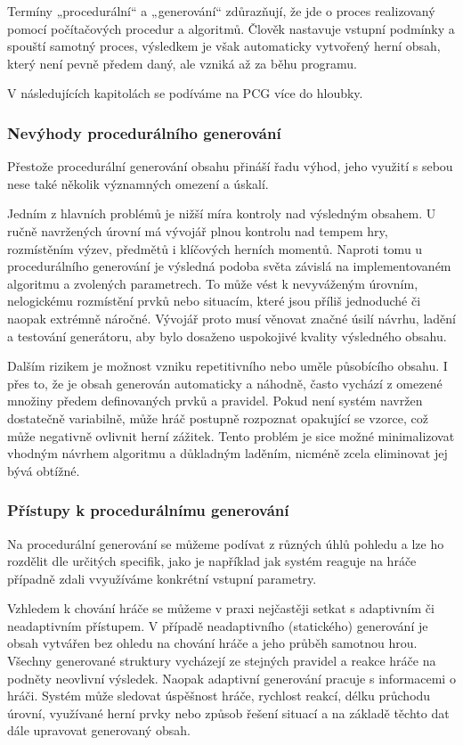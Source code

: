 \documentclass[
  program=itk,
  biblatex,
  figures=false,
  glossaries,
  index
]{kidiplom}
\begin{document}
Termíny „procedurální“ a „generování“ zdůrazňují, že jde o proces realizovaný pomocí počítačových procedur a algoritmů. Člověk nastavuje vstupní podmínky a spouští samotný proces, výsledkem je však automaticky vytvořený herní obsah, který není pevně předem daný, ale vzniká až za běhu programu.

V následujících kapitolách se podíváme na PCG více do hloubky.



\subsubsection{Nevýhody procedurálního generování}
Přestože procedurální generování obsahu přináší řadu výhod, jeho využití s sebou nese také několik významných omezení a úskalí.

Jedním z hlavních problémů je nižší míra kontroly nad výsledným obsahem. U ručně navržených úrovní má vývojář plnou kontrolu nad tempem hry, rozmístěním výzev, předmětů i klíčových herních momentů. Naproti tomu u procedurálního generování je výsledná podoba světa závislá na implementovaném algoritmu a zvolených parametrech. To může vést k nevyváženým úrovním, nelogickému rozmístění prvků nebo situacím, které jsou příliš jednoduché či naopak extrémně náročné. Vývojář proto musí věnovat značné úsilí návrhu, ladění a testování generátoru, aby bylo dosaženo uspokojivé kvality výsledného obsahu.

Dalším rizikem je možnost vzniku repetitivního nebo uměle působícího obsahu. I přes to, že je obsah generován automaticky a náhodně, často vychází z omezené množiny předem definovaných prvků a pravidel. Pokud není systém navržen dostatečně variabilně, může hráč postupně rozpoznat opakující se vzorce, což může negativně ovlivnit herní zážitek. Tento problém je sice možné minimalizovat vhodným návrhem algoritmu a důkladným laděním, nicméně zcela eliminovat jej bývá obtížné.


\subsubsection{Přístupy k procedurálnímu generování}
Na procedurální generování se můžeme podívat z různých úhlů pohledu a lze ho rozdělit dle určitých specifik, jako je například jak systém reaguje na hráče případně zdali vvyužíváme konkrétní vstupní parametry.

Vzhledem k chování hráče se můžeme v praxi nejčastěji setkat s adaptivním či neadaptivním přístupem. V případě neadaptivního (statického) generování je obsah vytvářen bez ohledu na chování hráče a jeho průběh samotnou hrou. Všechny generované struktury vycházejí ze stejných pravidel a reakce hráče na podněty neovlivní výsledek. Naopak adaptivní generování pracuje s informacemi o hráči. Systém může sledovat úspěšnost hráče, rychlost reakcí, délku průchodu úrovní, využívané herní prvky nebo způsob řešení situací a na základě těchto dat dále upravovat generovaný obsah.
\end{document}
